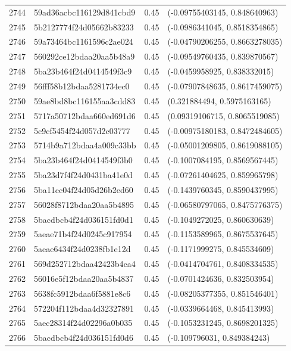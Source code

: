 \begin{table}[ht]
\begin{tabular}{rlrl}
  2744 & 59ad36acbc116129d841cbd9 & 0.45 & (-0.09755403145, 0.848640963) \\ 
  2745 & 5b2127774f24d05662b83233 & 0.45 & (-0.0986341045, 0.8518354865) \\ 
  2746 & 59a73464bc1161596c2ae024 & 0.45 & (-0.04790206255, 0.8663278035) \\ 
  2747 & 560292ce12bdaa20aa5b48a9 & 0.45 & (-0.09549760435, 0.839870567) \\ 
  2748 & 5ba23b464f24d0414549f3c9 & 0.45 & (-0.0459958925, 0.838332015) \\ 
  2749 & 56fff58b12bdaa5281734ec0 & 0.45 & (-0.07907848635, 0.8617459075) \\ 
  2750 & 59ae8bd8bc116155aa3cdd83 & 0.45 & (0.321884494, 0.5975163165) \\ 
  2751 & 5717a50712bdaa660ed691d6 & 0.45 & (0.09319106715, 0.8065519085) \\ 
  2752 & 5c9cf5454f24d057d2c03777 & 0.45 & (-0.00975180183, 0.8472484605) \\ 
  2753 & 5714b9a712bdaa4a009c33bb & 0.45 & (-0.05001209805, 0.8619088105) \\ 
  2754 & 5ba23b464f24d0414549f3b0 & 0.45 & (-0.1007084195, 0.8569567445) \\ 
  2755 & 5ba23d7f4f24d0431ba41e0d & 0.45 & (-0.07261404625, 0.859965798) \\ 
  2756 & 5ba11cc04f24d05d26b2ed60 & 0.45 & (-0.1439760345, 0.8590437995) \\ 
  2757 & 56028f8712bdaa20aa5b4895 & 0.45 & (-0.06580797065, 0.8475776375) \\ 
  2758 & 5bacdbcb4f24d036151fd0d1 & 0.45 & (-0.1049272025, 0.860630639) \\ 
  2759 & 5aeae71b4f24d0245c917954 & 0.45 & (-0.1153589965, 0.8675537645) \\ 
  2760 & 5aeae6434f24d0238fb1e12d & 0.45 & (-0.1171999275, 0.845534609) \\ 
  2761 & 569d252712bdaa42423b4ca4 & 0.45 & (-0.0414704761, 0.8408334535) \\ 
  2762 & 56016e5f12bdaa20aa5b4837 & 0.45 & (-0.0701424636, 0.832503954) \\ 
  2763 & 5638fc5912bdaa6f5881e8c6 & 0.45 & (-0.08205377355, 0.851546401) \\ 
  2764 & 572204f112bdaa4d32327891 & 0.45 & (-0.0339664468, 0.845413993) \\ 
  2765 & 5aec28314f24d02296a0b035 & 0.45 & (-0.1053231245, 0.8698201325) \\ 
  2766 & 5bacdbcb4f24d036151fd0d6 & 0.45 & (-0.109796031, 0.849384243) \\ 

\end{tabular}
\end{table}
